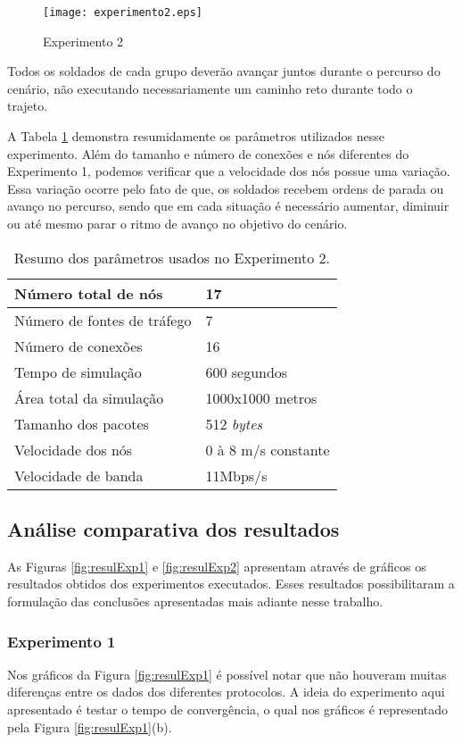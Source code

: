 \begin{figure}[H]
	\centering
	\texttt{[image: experimento2.eps]}
	\caption{Experimento 2}
	\label{figExp2}
\end{figure}

Todos os soldados de cada grupo dever\~ao avan\c{c}ar juntos durante o percurso do cen\'ario, n\~ao executando necessariamente um caminho reto durante todo o trajeto.

A Tabela \ref{tabParamExp2} demonstra resumidamente os par\^ametros utilizados nesse experimento. 
Al\'em do tamanho e n\'umero de conex\~oes e n\'os diferentes do Experimento 1, podemos verificar que a velocidade dos n\'os possue uma varia\c{c}\~ao.
Essa varia\c{c}\~ao ocorre pelo fato de que, os soldados recebem ordens de parada ou avan\c{c}o no percurso, sendo que em cada situa\c{c}\~ao \'e necess\'ario aumentar, diminuir ou at\'e mesmo parar o ritmo de avan\c{c}o no objetivo do cen\'ario.

\begin{table}[H]
	\centering
	\caption{Resumo dos par\^ametros usados no Experimento 2.}
	\begin{tabular}{ | l | l | }
		\hline
		N\'umero total de n\'os & 17 \\ \hline
		N\'umero de fontes de tr\'afego & 7 \\ \hline
		N\'umero de conex\~oes & 16 \\ \hline
		Tempo de simula\c{c}\~ao & 600 segundos \\ \hline
		\'Area total da simula\c{c}\~ao & 1000x1000 metros \\ \hline
		Tamanho dos pacotes & 512 \textit{bytes} \\ \hline
		Velocidade dos n\'os & 0 \`a 8 m/s constante \\ \hline
		Velocidade de banda & 11Mbps/s \\ \hline
	\end{tabular}
	\label{tabParamExp2}
\end{table}

\subsection{An\'alise comparativa dos resultados}
As Figuras \ref{fig:resulExp1} e \ref{fig:resulExp2} apresentam atrav\'es de gr\'aficos os resultados obtidos dos experimentos executados. Esses resultados possibilitaram a formula\c{c}\~ao das conclus\~oes apresentadas mais adiante nesse trabalho.

\subsubsection{Experimento 1}
Nos gr\'aficos da Figura \ref{fig:resulExp1} \'e poss\'ivel notar que n\~ao houveram muitas diferen\c{c}as entre os dados dos diferentes protocolos. A ideia do experimento aqui apresentado \'e testar o tempo de converg\^encia, o qual nos gr\'aficos \'e representado pela Figura \ref{fig:resulExp1}(b).

